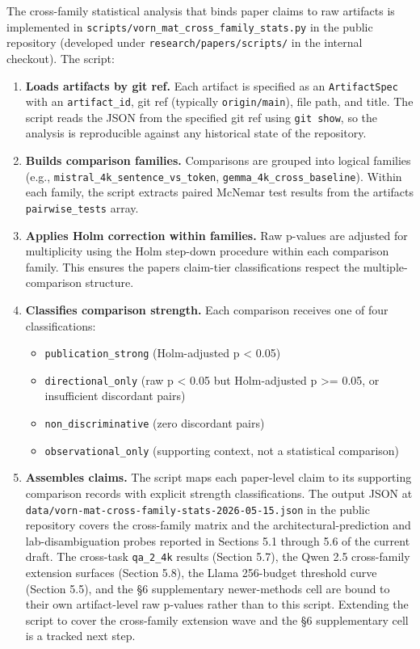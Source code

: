 \documentclass[10pt]{article}
\providecommand{\tightlist}{%
 \setlength{\itemsep}{0pt}\setlength{\parskip}{0pt}}
\begin{document}
The cross-family statistical analysis that binds paper claims to raw
artifacts is implemented in
\texttt{scripts/\allowbreak{}vorn\_mat\_cross\_family\_stats.\allowbreak{}py} in the public
repository (developed under \texttt{research/papers/scripts/} in the
internal checkout). The script:

\begin{enumerate}
\def\labelenumi{\arabic{enumi}.}
\item
 \textbf{Loads artifacts by git ref.} Each artifact is specified as an
 \texttt{ArtifactSpec} with an \texttt{artifact\_id}, git ref
 (typically \texttt{origin/main}), file path, and title. The script
 reads the JSON from the specified git ref using \texttt{git\ show}, so
 the analysis is reproducible against any historical state of the
 repository.
\item
 \textbf{Builds comparison families.} Comparisons are grouped into
 logical families (e.g., \texttt{mistral\_4k\_sentence\_vs\_token},
 \texttt{gemma\_4k\_cross\_baseline}). Within each family, the script
 extracts paired McNemar test results from the
 artifact\textquotesingle s \texttt{pairwise\_tests} array.
\item
 \textbf{Applies Holm correction within families.} Raw p-values are
 adjusted for multiplicity using the Holm step-down procedure within
 each comparison family. This ensures the paper\textquotesingle s
 claim-tier classifications respect the multiple-comparison structure.
\item
 \textbf{Classifies comparison strength.} Each comparison receives one
 of four classifications:

 \begin{itemize}
 \tightlist
 \item
 \texttt{publication\_strong} (Holm-adjusted p \textless{} 0.05)
 \item
 \texttt{directional\_only} (raw p \textless{} 0.05 but Holm-adjusted
 p \textgreater= 0.05, or insufficient discordant pairs)
 \item
 \texttt{non\_discriminative} (zero discordant pairs)
 \item
 \texttt{observational\_only} (supporting context, not a statistical
 comparison)
 \end{itemize}
\item
 \textbf{Assembles claims.} The script maps each paper-level claim to
 its supporting comparison records with explicit strength
 classifications. The output JSON at
 \texttt{data/\allowbreak{}vorn-mat-cross-family-stats-2026-05-15.\allowbreak{}json} in the
 public repository covers the cross-family matrix and the
 architectural-prediction and lab-disambiguation probes reported in
 Sections 5.1 through 5.6 of the current draft. The cross-task
 \texttt{qa\_2\_4k} results (Section 5.7), the Qwen 2.5 cross-family
 extension surfaces (Section 5.8), the Llama 256-budget threshold curve
 (Section 5.5), and the \S{}6 supplementary newer-methods cell are bound
 to their own artifact-level raw p-values rather than to this script.
 Extending the script to cover the cross-family extension wave and the
 \S{}6 supplementary cell is a tracked next step.
\end{enumerate}
\end{document}
